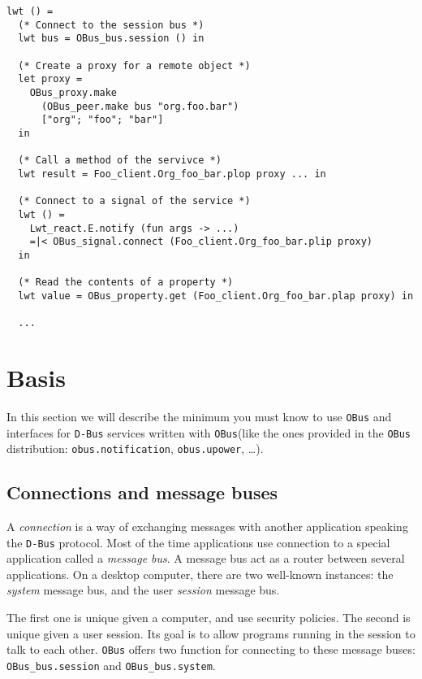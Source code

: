 \documentclass{article}
\newcommand{\obus}{\texttt{OBus}\xspace}
\newcommand{\dbus}{\texttt{D-Bus}\xspace}
\begin{document}
\lstset{language=[Objective]Caml}
\begin{lstlisting}
lwt () =
  (* Connect to the session bus *)
  lwt bus = OBus_bus.session () in

  (* Create a proxy for a remote object *)
  let proxy =
    OBus_proxy.make
      (OBus_peer.make bus "org.foo.bar")
      ["org"; "foo"; "bar"]
  in

  (* Call a method of the servivce *)
  lwt result = Foo_client.Org_foo_bar.plop proxy ... in

  (* Connect to a signal of the service *)
  lwt () =
    Lwt_react.E.notify (fun args -> ...)
    =|< OBus_signal.connect (Foo_client.Org_foo_bar.plip proxy)
  in

  (* Read the contents of a property *)
  lwt value = OBus_property.get (Foo_client.Org_foo_bar.plap proxy) in

  ...
\end{lstlisting}

\section{Basis}

In this section we will describe the minimum you must know to use
\obus and interfaces for \dbus services written with \obus (like the
ones provided in the \obus distribution: \texttt{obus.notification},
\texttt{obus.upower}, \dots).

\subsection{Connections and message buses}

A \emph{connection} is a way of exchanging messages with another
application speaking the \dbus protocol. Most of the time applications
use connection to a special application called a \emph{message bus}. A
message bus act as a router between several applications. On a desktop
computer, there are two well-known instances: the \emph{system}
message bus, and the user \emph{session} message bus.

The first one is unique given a computer, and use security
policies. The second is unique given a user session. Its goal is to
allow programs running in the session to talk to each other. \obus
offers two function for connecting to these message buses:
\texttt{OBus\_bus.session} and \texttt{OBus\_bus.system}.
\end{document}
